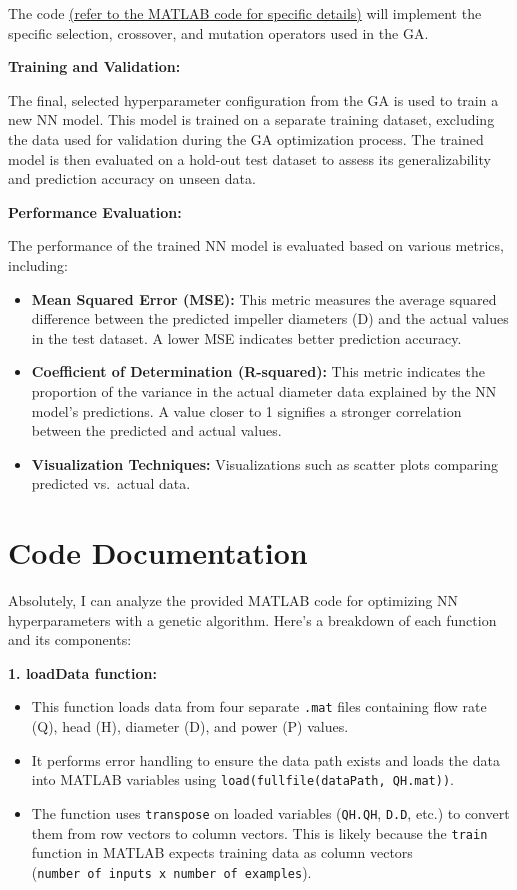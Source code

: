 \documentclass[
  super,
  review,
  3p]{elsarticle}
\providecommand{\tightlist}{%
  \setlength{\itemsep}{0pt}\setlength{\parskip}{0pt}}\usepackage{longtable,booktabs,array}
\begin{document}
The code
\href{https://github.com/MohammedTwheed/trimming-code/blob/main/trimming_code.m}{(refer
to the MATLAB code for specific details)} will implement the specific
selection, crossover, and mutation operators used in the GA.

\textbf{Training and Validation:}

The final, selected hyperparameter configuration from the GA is used to
train a new NN model. This model is trained on a separate training
dataset, excluding the data used for validation during the GA
optimization process. The trained model is then evaluated on a hold-out
test dataset to assess its generalizability and prediction accuracy on
unseen data.

\textbf{Performance Evaluation:}

The performance of the trained NN model is evaluated based on various
metrics, including:

\begin{itemize}
\tightlist
\item
  \textbf{Mean Squared Error (MSE):} This metric measures the average
  squared difference between the predicted impeller diameters (D) and
  the actual values in the test dataset. A lower MSE indicates better
  prediction accuracy.
\item
  \textbf{Coefficient of Determination (R-squared):} This metric
  indicates the proportion of the variance in the actual diameter data
  explained by the NN model's predictions. A value closer to 1 signifies
  a stronger correlation between the predicted and actual values.
\item
  \textbf{Visualization Techniques:} Visualizations such as scatter
  plots comparing predicted vs.~actual data.
\end{itemize}

\section{Code Documentation}\label{code-documentation}

Absolutely, I can analyze the provided MATLAB code for optimizing NN
hyperparameters with a genetic algorithm. Here's a breakdown of each
function and its components:

\textbf{1. loadData function:}

\begin{itemize}
\tightlist
\item
  This function loads data from four separate \texttt{.mat} files
  containing flow rate (Q), head (H), diameter (D), and power (P)
  values.
\item
  It performs error handling to ensure the data path exists and loads
  the data into MATLAB variables using
  \texttt{load(fullfile(dataPath,\ \textquotesingle{}QH.mat\textquotesingle{}))}.
\item
  The function uses \texttt{transpose} on loaded variables
  (\texttt{QH.QH}, \texttt{D.D}, etc.) to convert them from row vectors
  to column vectors. This is likely because the \texttt{train} function
  in MATLAB expects training data as column vectors
  (\texttt{number\ of\ inputs\ x\ number\ of\ examples}).
\end{itemize}
\end{document}
